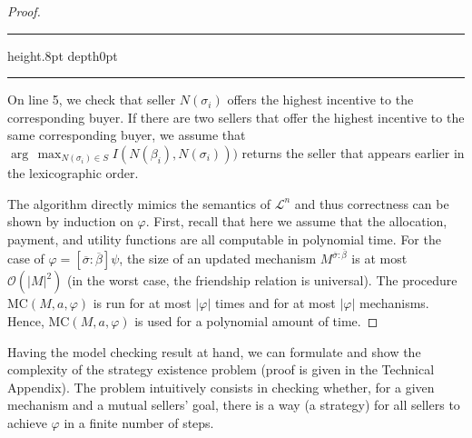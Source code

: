 \documentclass[letterpaper]{article} %
\makeatletter
\theoremstyle{definition}
\newenvironment{breakablealgorithm}
  {%
   \begin{center}
     \refstepcounter{algorithm}%
     \hrule height.8pt depth0pt \kern2pt%
     \renewcommand{\caption}[2][\relax]{%
       {\raggedright\textbf{\fname@algorithm~\thealgorithm} ##2\par}%
       \ifx\relax##1\relax %
         \addcontentsline{loa}{algorithm}{\protect\numberline{\thealgorithm}##2}%
       \else %
         \addcontentsline{loa}{algorithm}{\protect\numberline{\thealgorithm}##1}%
       \fi
       \kern2pt\hrule\kern2pt
     }
  }{%
     \kern2pt\hrule\relax%
   \end{center}
  }
\makeatother
\begin{document}
\begin{proof}
\begin{breakablealgorithm}
\begin{algorithmic}[1]
	\end{algorithmic}
\end{breakablealgorithm}

On line 5, we check that seller $N(\sigma_i)$ offers the highest incentive to the corresponding buyer. If there are two sellers that offer the highest incentive to the same corresponding buyer, we assume that $\arg\,\max_{N(\sigma_i) \in S} I (N(\beta_i),N(\sigma_i)))$ returns the seller that appears earlier in the lexicographic order.

The algorithm directly mimics %
the semantics of $\mathcal{L}^n$ and thus correctness can be shown by induction on $\varphi$. %
First, recall that here we assume that the allocation, payment, and utility functions are all computable in polynomial time. For the case of $\varphi = [\overline{\sigma}:\overline{\beta}] \psi$, the size of an updated mechanism $M^{\overline{\sigma}:\overline{\beta}}$ is at most $\mathcal{O}(|M|^2)$ (in the worst case, the friendship relation is universal). The procedure \textsc{MC}$(M, a, \varphi)$ is run for at most $|\varphi|$ times and for at most $|\varphi|$ mechanisms. Hence, \textsc{MC}$(M, a, \varphi)$ is used for a polynomial amount of time.
\end{proof}

Having the model checking result at hand, we can formulate and show the complexity of the strategy existence problem (proof is given in the Technical Appendix). The problem intuitively consists in checking whether, for a given mechanism and a mutual sellers' goal, %
there is a way (a strategy) for all sellers to achieve $\varphi$ in a finite number of steps. 
\end{document}

